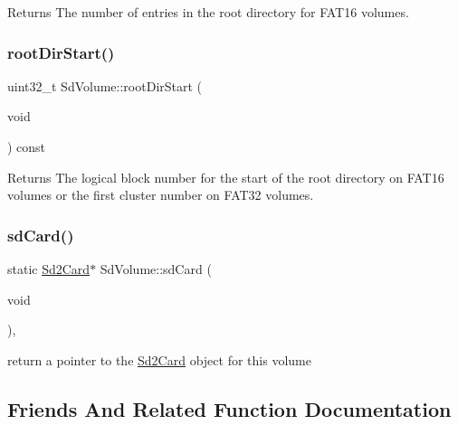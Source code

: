 \begin{DoxyReturn}{Returns}
The number of entries in the root directory for F\+A\+T16 volumes. 
\end{DoxyReturn}
\mbox{\label{class_sd_volume_aeb10811341acc97f7ccda2394c777072}} 
\subsubsection{\texorpdfstring{root\+Dir\+Start()}{rootDirStart()}}
{\footnotesize\ttfamily uint32\+\_\+t Sd\+Volume\+::root\+Dir\+Start (\begin{DoxyParamCaption}\item[{void}]{ }\end{DoxyParamCaption}) const\hspace{0.3cm}{\ttfamily [inline]}}

\begin{DoxyReturn}{Returns}
The logical block number for the start of the root directory on F\+A\+T16 volumes or the first cluster number on F\+A\+T32 volumes. 
\end{DoxyReturn}
\mbox{\label{class_sd_volume_a6bc465a30e167d8d440eb3cda194ee79}} 
\subsubsection{\texorpdfstring{sd\+Card()}{sdCard()}}
{\footnotesize\ttfamily static \hyperlink{class_sd2_card}{Sd2\+Card}$\ast$ Sd\+Volume\+::sd\+Card (\begin{DoxyParamCaption}\item[{void}]{ }\end{DoxyParamCaption})\hspace{0.3cm}{\ttfamily [inline]}, {\ttfamily [static]}}

return a pointer to the \hyperlink{class_sd2_card}{Sd2\+Card} object for this volume 

\subsection{Friends And Related Function Documentation}
\mbox{\label{class_sd_volume_ad89809cf54bdf885b0505e5edeff2049}} 
